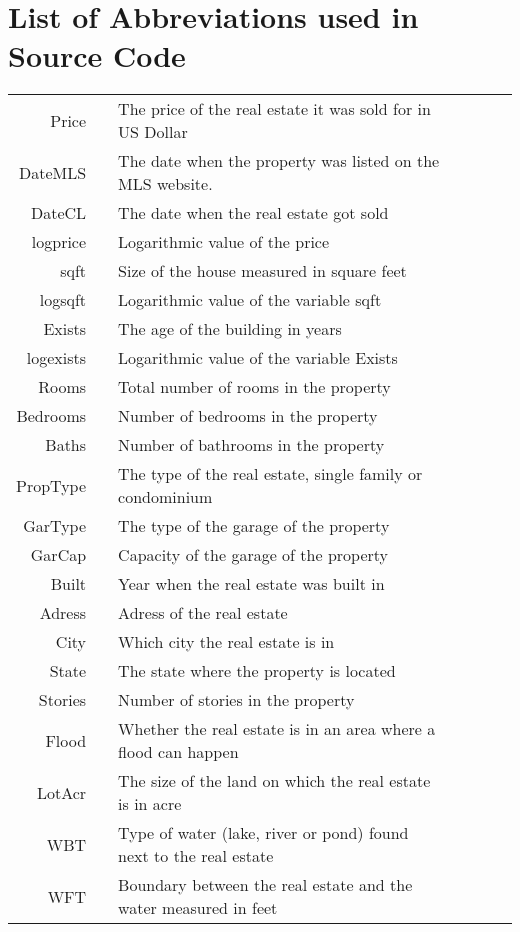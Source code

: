 
\section*{List of Abbreviations used in Source Code}
\begin{tabular}{rp{0.2cm}lp{1cm}rp{0.2cm}l}
Price     & &  The price of the real estate it was sold for in US Dollar && && \\
DateMLS    & & The date when the property was listed on the MLS website. && &&  \\
DateCL  & &  The date when the real estate got sold  &&  && \\ 
logprice  &&  Logarithmic value of the price    && &&   \\
sqft &&    Size of the house measured in square feet   && &&    \\     
logsqft    & &  Logarithmic value of the variable sqft    && &&     \\
Exists & &  The age of the building in years   && &&     \\
logexists    & &  Logarithmic value of the variable Exists   && &&   \\
Rooms    & &  Total number of rooms in the property   && &&   \\
Bedrooms    & &  Number of bedrooms in the property   && &&   \\
Baths    & &  Number of bathrooms in the property   && &&   \\
PropType     & &  The type of the real estate, single family or condominium    && &&    \\ 
GarType   & &  The type of the garage of the property  && &&     \\
GarCap     & &      Capacity of the garage of the property    && &&       \\
Built    & &  Year when the real estate was built in   && &&   \\
Adress    & &  Adress of the real estate   && &&   \\
City   & &  Which city the real estate is in   && &&   \\
State     & &    The state where the property is located   && &&   \\
Stories    & &  Number of stories in the property   && &&   \\
Flood    & &  Whether the real estate is in an area where a flood can happen   && &&   \\
LotAcr   & & The size of the land on which the real estate is in acre  && &&   \\
WBT   & &  Type of water (lake, river or pond) found next to the real estate   && &&   \\
WFT   & &  Boundary between the real estate and the water measured in feet   && &&   \\

\end{tabular}
